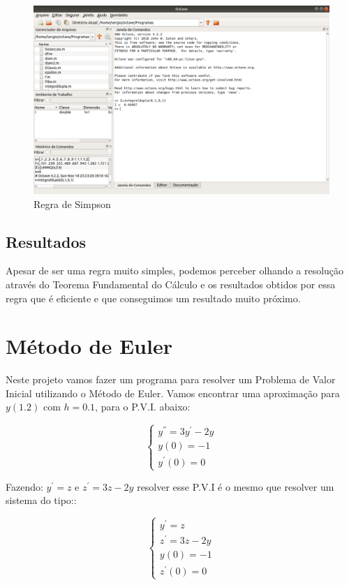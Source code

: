 \documentclass[11pt, openright, a4paper, brazil, openany, oneside]{abntex2}
\begin{document}
\begin{figure}[ht]

    \center

    \includegraphics[width=12cm]{octave2.png}
    \caption{Regra de Simpson \label{octave2}}
    
\end{figure}

\section{Resultados}

Apesar de ser uma regra muito simples, podemos perceber olhando a resolução através do Teorema Fundamental do Cálculo e os resultados obtidos por essa regra que é eficiente e que conseguimos um resultado muito próximo.


\chapter{Método de Euler}

Neste projeto vamos fazer um programa para resolver um Problema de Valor Inicial utilizando o Método de Euler. Vamos encontrar uma aproximação para $y(1.2)$ com $h = 0.1$, para o P.V.I. abaixo:

$$
\left\{\begin{array}{l}
y^{''} = 3y^{'} - 2y \\ y(0) = -1 \\ y^{'}(0) = 0 
\end{array}\right.
$$

Fazendo: $y^{'}=z$ e $z^{'}=3z - 2y$ resolver esse P.V.I é o mesmo que resolver um sistema do tipo::

$$
\left\{\begin{array}{l}
y^{'} = z \\ z^{'} = 3z-2y \\ y(0) = -1 \\ z^{'}(0) = 0 
\end{array}\right.
$$
\end{document}
